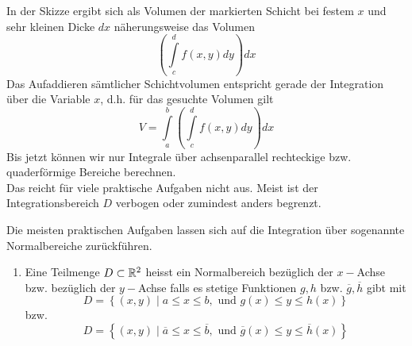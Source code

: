 In der Skizze ergibt sich als Volumen der markierten Schicht bei festem $x$ und sehr kleinen Dicke $dx$ näherungsweise das Volumen \[\left( {\int\limits_c^d {f\left( {x,y} \right)dy} } \right)dx\] Das Aufaddieren sämtlicher Schichtvolumen entspricht gerade der Integration über die Variable $x$, d.h. für das gesuchte Volumen gilt \[V = \int\limits_a^b {\left( {\int\limits_c^d {f\left( {x,y} \right)dy} } \right)dx} \]
Bis jetzt können wir nur Integrale über achsenparallel rechteckige bzw. quaderförmige Bereiche berechnen.\\

Das reicht für viele praktische Aufgaben nicht aus. Meist ist der Integrationsbereich $D$ verbogen oder zumindest anders begrenzt.

\begin{center}
\end{center}

Die meisten praktischen Aufgaben lassen sich auf die Integration über sogenannte Normalbereiche zurückführen.

\begin{definition}{9.10}
\begin{enumerate}
\item Eine Teilmenge $D\subset\mathbb{R}^2$ heisst ein Normalbereich bezüglich der $x-$Achse bzw. bezüglich der $y-$Achse falls es stetige Funktionen $g,h$ bzw. $\overline{g},\overline{h}$ gibt mit
\[D=\left\{ \left( x,y\right)\mid a\leq x\leq b,\text{ und }g(x)\leq y\leq h(x)\right\}\]
bzw.
\[D=\left\{ \left( x,y\right)\mid \overline{a}\leq x\leq \overline{b},\text{ und }\overline{g}(x)\leq y\leq \overline{h}(x)\right\}\]
\end{enumerate}
\end{definition}

